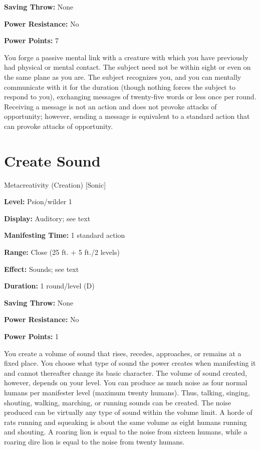 \documentclass{article}
\begin{document}
\textbf{Saving Throw:} None

\textbf{Power Resistance:} No

\textbf{Power Points:} 7

You forge a passive mental link with a creature with which you have previously 
had physical or mental contact. The subject need not be within sight or even on 
the same plane as you are. The subject recognizes you, and you can mentally communicate 
with it for the duration (though nothing forces the subject to respond to you), 
exchanging messages of twenty-five words or less once per round. Receiving a message 
is not an action and does not provoke attacks of opportunity; however, sending 
a message is equivalent to a standard action that can provoke attacks of opportunity.

\vspace{12pt}
\section*{Create Sound}

Metacreativity (Creation) [Sonic]

\textbf{Level:} Psion/wilder 1

\textbf{Display:} Auditory; see text

\textbf{Manifesting Time:} 1 standard action

\textbf{Range:} Close (25 ft. + 5 ft./2 levels)

\textbf{Effect:} Sounds; see text

\textbf{Duration:} 1 round/level (D)

\textbf{Saving Throw:} None

\textbf{Power Resistance:} No

\textbf{Power Points:} 1

You create a volume of sound that rises, recedes, approaches, or remains at a fixed 
place. You choose what type of sound the power creates when manifesting it and 
cannot thereafter change its basic character. The volume of sound created, however, 
depends on your level. You can produce as much noise as four normal humans per 
manifester level (maximum twenty humans). Thus, talking, singing, shouting, walking, 
marching, or running sounds can be created. The noise produced can be virtually 
any type of sound within the volume limit. A horde of rats running and squeaking 
is about the same volume as eight humans running and shouting. A roaring lion is 
equal to the noise from sixteen humans, while a roaring dire lion is equal to the 
noise from twenty humans.
\end{document}
